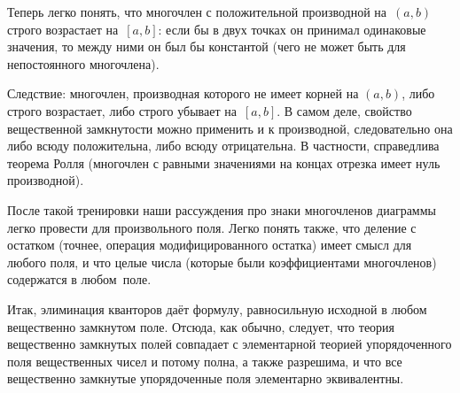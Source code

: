 Теперь легко понять, что многочлен с положительной производной
на~$(a,b)$ строго возрастает на~$[a,b]$: если бы в двух точках он
принимал одинаковые значения, то между ними он был бы константой
(чего не может быть для непостоянного многочлена).

Следствие: многочлен, производная которого не имеет корней на
$(a,b)$, либо строго возрастает, либо строго убывает на~$[a,b]$.
В самом деле, свойство вещественной замкнутости можно применить
и к производной, следовательно она либо всюду положительна, либо
всюду отрицательна. В частности, справедлива теорема Ролля%
(многочлен с равными значениями на концах отрезка имеет нуль
производной).

После такой тренировки наши рассуждения про знаки многочленов
диаграммы легко провести для произвольного поля. Легко понять
также, что деление с остатком (точнее, операция
модифицированного остатка) имеет смысл для любого поля, и что
целые числа (которые были коэффициентами многочленов) содержатся
в любом~поле.

Итак, элиминация кванторов даёт формулу, равносильную исходной в
любом вещественно замкнутом поле. Отсюда, как обычно, следует,
что теория вещественно замкнутых полей совпадает с элементарной
теорией упорядоченного поля вещественных чисел и потому полна, а
также разрешима, и что все вещественно замкнутые упорядоченные
поля элементарно эквивалентны.


